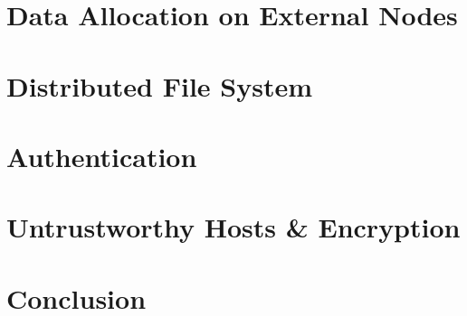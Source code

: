 \documentclass[a4paper,11pt]{article}
\begin{document}
\section{Data Allocation on External Nodes}

\section{Distributed File System}

\section{Authentication}
%

\section{Untrustworthy Hosts \& Encryption}
%

\section{Conclusion}


\end{document}

